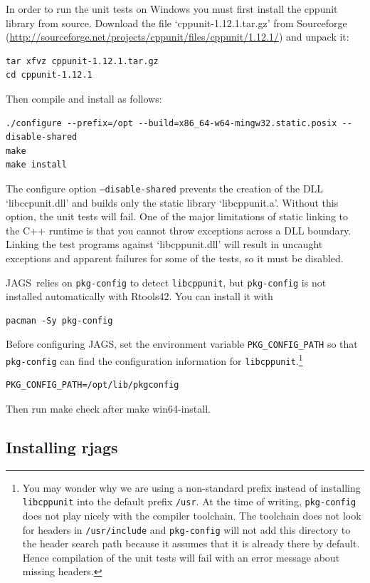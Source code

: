 \documentclass[11pt, a4paper, titlepage]{article}
\newcommand{\JAGS}{\textsf{JAGS}}
\newcommand{\code}[1]{{\bgroup{\normalfont\ttfamily #1}\egroup}}
\newcommand{\file}[1]{{`\normalfont\textsf{#1}'}}
\begin{document}
In order to run the unit tests on Windows you must first install the
cppunit library from source. Download the file \file{cppunit-1.12.1.tar.gz}
from Sourceforge (\url{http://sourceforge.net/projects/cppunit/files/cppunit/1.12.1/}) and
unpack it:
\begin{verbatim}
tar xfvz cppunit-1.12.1.tar.gz
cd cppunit-1.12.1
\end{verbatim}
Then compile and install as follows:
\begin{verbatim}
./configure --prefix=/opt --build=x86_64-w64-mingw32.static.posix --disable-shared
make
make install
\end{verbatim}

The configure option \texttt{--disable-shared} prevents the creation of
the DLL \file{libccpunit.dll} and builds only the static library
\file{libcppunit.a}. Without this option, the unit tests will fail.
One of the major limitations of static linking to the C++ runtime is
that you cannot throw exceptions across a DLL boundary.  Linking the
test programs against \file{libcppunit.dll} will result in uncaught
exceptions and apparent failures for some of the tests, so it must be
disabled.

\JAGS\ relies on \texttt{pkg-config} to detect \texttt{libcppunit}, but
\texttt{pkg-config} is not installed automatically with Rtools42. You
can install it with
\begin{verbatim}
pacman -Sy pkg-config
\end{verbatim}

Before configuring \JAGS, set the environment variable
\texttt{PKG\_CONFIG\_PATH} so that \texttt{pkg-config} can find the
configuration information for \texttt{libcppunit}.\footnote{You may
wonder why we are using a non-standard prefix instead of installing
\texttt{libcppunit} into the default prefix \texttt{/usr}. At the time
of writing, \texttt{pkg-config} does not play nicely with the compiler
toolchain. The toolchain does not look for headers in
\texttt{/usr/include} and \texttt{pkg-config} will not add this
directory to the header search path because it assumes that it is
already there by default. Hence compilation of the unit tests will
fail with an error message about missing headers.}
\begin{verbatim}
PKG_CONFIG_PATH=/opt/lib/pkgconfig
\end{verbatim}
Then run \code{make check} after \code{make win64-install}.

\subsection{Installing rjags}
\end{document}

